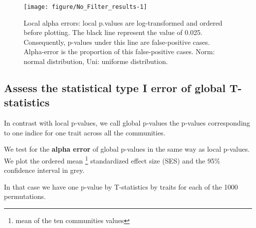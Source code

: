 \documentclass[12pt]{article}\usepackage[]{graphicx}\usepackage[]{color}
\newenvironment{knitrout}{}{} %
\begin{document}
\begin{knitrout}
\begin{figure}
{\centering \texttt{[image: figure/No\_Filter\_results-1]} 

}

\caption[Local alpha errors]{Local alpha errors: local p.values are log-transformed and ordered before plotting. The black line represent the value of 0.025. Consequently, p-values under this line are false-positive cases. Alpha-error is the proportion of this false-positive cases. Norm: normal distribution, Uni: uniforme distribution.\label{fig:No_Filter_results}}
\end{figure}


\end{knitrout}

 \subsection {Assess the statistical type I error of global T-statistics}

In contrast with local p-values, we call global p-values the p-values corresponding to one indice for one trait across all the communities. 

We test for the \textbf{alpha error} of global p-values in the same way as local p-values. We plot the ordered mean \footnote{mean of the ten communities values} standardized effect size (SES) and the 95\% confidence interval in grey. 

In that case we have one p-value by T-statistics by traits for each of the 1000 permutations.
\end{document}
